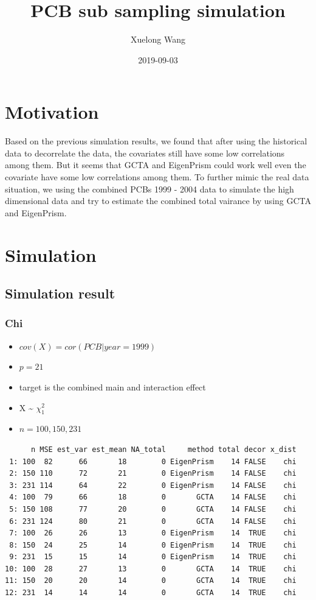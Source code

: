 \documentclass[]{article}
\title{PCB sub sampling simulation}
\author{Xuelong Wang}
\date{2019-09-03}
\providecommand{\tightlist}{%
  \setlength{\itemsep}{0pt}\setlength{\parskip}{0pt}}
\begin{document}
\maketitle

{
\setcounter{tocdepth}{2}
\tableofcontents
}
\section{Motivation}\label{motivation}

Based on the previous simulation results, we found that after using the
historical data to decorrelate the data, the covariates still have some
low correlations among them. But it seems that GCTA and EigenPrism could
work well even the covariate have some low correlations among them. To
further mimic the real data situation, we using the combined PCBs 1999 -
2004 data to simulate the high dimensional data and try to estimate the
combined total vairance by using GCTA and EigenPrism.

\section{Simulation}\label{simulation}

\subsection{Simulation result}\label{simulation-result}

\subsubsection{Chi}\label{chi}

\begin{itemize}
\tightlist
\item
  \(cov(X) = cor(PCB|year = 1999)\)
\item
  \(p = 21\)
\item
  target is the combined main and interaction effect
\item
  X \textasciitilde{} \(\chi^2_1\)
\item
  \(n = 100, 150, 231\)
\end{itemize}

\begin{verbatim}
      n MSE est_var est_mean NA_total     method total decor x_dist
 1: 100  82      66       18        0 EigenPrism    14 FALSE    chi
 2: 150 110      72       21        0 EigenPrism    14 FALSE    chi
 3: 231 114      64       22        0 EigenPrism    14 FALSE    chi
 4: 100  79      66       18        0       GCTA    14 FALSE    chi
 5: 150 108      77       20        0       GCTA    14 FALSE    chi
 6: 231 124      80       21        0       GCTA    14 FALSE    chi
 7: 100  26      26       13        0 EigenPrism    14  TRUE    chi
 8: 150  24      25       14        0 EigenPrism    14  TRUE    chi
 9: 231  15      15       14        0 EigenPrism    14  TRUE    chi
10: 100  28      27       13        0       GCTA    14  TRUE    chi
11: 150  20      20       14        0       GCTA    14  TRUE    chi
12: 231  14      14       14        0       GCTA    14  TRUE    chi
\end{verbatim}
\end{document}
